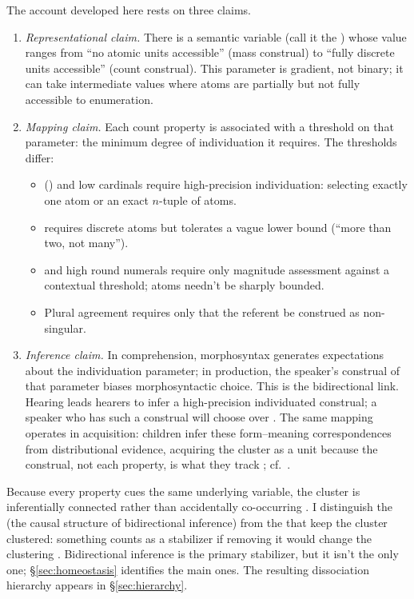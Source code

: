 \documentclass[12pt,a4paper]{article}
\begin{document}
The account developed here rests on three claims.

\begin{enumerate}
\item \textit{Representational claim.} There is a semantic variable (call it the ) whose value ranges from \enquote{no atomic units accessible} (mass construal) to \enquote{fully discrete units accessible} (count construal). This parameter is gradient, not binary; it can take intermediate values where atoms are partially but not fully accessible to enumeration.

\item \textit{Mapping claim.} Each count property is associated with a threshold on that parameter: the minimum degree of individuation it requires. The thresholds differ:

\begin{itemize}
\item {}() and low cardinals require high-precision individuation: selecting exactly one atom or an exact $n$-tuple of atoms.
\item {} requires discrete atoms but tolerates a vague lower bound (\enquote{more than two, not many}).
\item {} and high round numerals require only magnitude assessment against a contextual threshold; atoms needn't be sharply bounded.
\item Plural agreement requires only that the referent be construed as non-singular.
\end{itemize}

\item \textit{Inference claim.} In comprehension, morphosyntax generates expectations about the individuation parameter; in production, the speaker's construal of that parameter biases morphosyntactic choice. This is the bidirectional link. Hearing  leads hearers to infer a high-precision individuated construal; a speaker who has such a construal will choose  over . The same mapping operates in acquisition: children infer these form--meaning correspondences from distributional evidence, acquiring the cluster as a unit because the construal, not each property, is what they track \citep{bybee2010}; cf.\ \textcite{tomasello2003}.
\end{enumerate}

Because every property cues the same underlying variable, the cluster is inferentially connected rather than accidentally co-occurring \citep{boyd1991,khalidi2013}. I distinguish the  (the causal structure of bidirectional inference) from the  that keep the cluster clustered: something counts as a stabilizer if removing it would change the clustering \citep{reynolds2025stack}. Bidirectional inference is the primary stabilizer, but it isn't the only one; \S\ref{sec:homeostasis} identifies the main ones. The resulting dissociation hierarchy appears in \S\ref{sec:hierarchy}.
\end{document}
